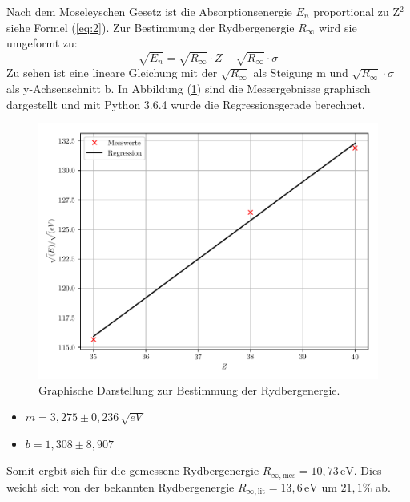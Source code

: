 Nach dem Moseleyschen Gesetz ist die Absorptionsenergie $E_n$ proportional zu Z$^2$ siehe Formel (\ref{eq:2}).
Zur Bestimmung der Rydbergenergie $R_\infty$ wird sie umgeformt zu:
\begin{equation*}
  \sqrt{E_n} = \sqrt{R_\infty} \cdot Z - \sqrt{R_\infty} \cdot \sigma
\end{equation*}
Zu sehen ist eine lineare Gleichung mit der $\sqrt{R_\infty}$ als Steigung m und $\sqrt{R_\infty} \cdot \sigma$ als
y-Achsenschnitt b.
In Abbildung (\ref{abb:3}) sind die Messergebnisse graphisch dargestellt und mit Python 3.6.4 wurde
die Regressionsgerade berechnet.
\begin{figure}[H]
  \centering
  \includegraphics[width=\textwidth]{plot1.pdf}
  \caption{Graphische Darstellung zur Bestimmung der Rydbergenergie.}
  \label{abb:3}
\end{figure}
\begin{itemize}
  \item $m =  3,275 \pm 0,236 \, \text{$\sqrt{eV}$}$
  \item $b =  1,308 \pm 8,907$
\end{itemize}
Somit ergbit sich für die gemessene Rydbergenergie $R_{\infty,\text{mes}} = 10,73 \, \text{eV}$.
Dies weicht sich von der bekannten Rydbergenergie $R_{\infty, \text{lit}} = 13,6 \, \text{eV}$
um $21,1 \%$ ab.


